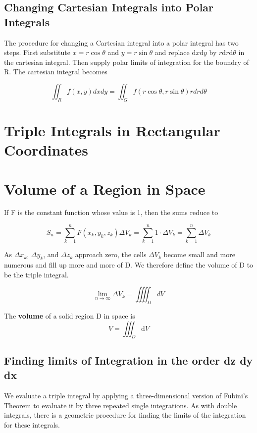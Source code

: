 \documentclass[12pt,a4paper,draft]{article}
\newenvironment{definition}{\begin{definitionbox}}{\end{definitionbox}\vspace{1\baselineskip}}
\begin{document}
\subsection{Changing Cartesian Integrals into Polar Integrals}

The procedure for changing a Cartesian integral into a polar integral has two steps. First substitute \(x = r \cos \theta\) and \(y = r \sin \theta\) and replace \(\mathrm{d}x \mathrm{d}y\) by \(r \mathrm{d}r \mathrm{d}\theta\) in the cartesian integral. Then supply polar limits of integration for the boundry of R. The cartesian integral becomes

\[\iint_R f(x,y) dx dy = \iint_G f(r \cos \theta, r \sin \theta) r dr d\theta\]




\section{Triple Integrals in Rectangular Coordinates}

\section{Volume of a Region in Space}

If F is the constant function whose value is 1, then the sums reduce to

\[S_n = \sum_{k=1}^{n} F(x_k, y_k ,z_k) \Delta V_k = \sum_{k=1}^{n} 1 \cdot \Delta V_k = \sum_{k=1}^{n}  \Delta V_k \] 




As \(\Delta x_k\), \(\Delta y_k\), and \(\Delta z_k\) approach zero, the cells \(\Delta V_k\) become small and more numerous and fill up more and more of D. We therefore define the volume of D to be the triple integral.

\[\lim_{n \to \infty} \Delta V_k = \iiiint_D dV\]



\begin{definition}
    The \textbf{volume} of a solid region D in space is
    \[V = \iiint_D \mathrm{d}V\]
\end{definition}


\subsection{Finding limits of Integration in the order dz dy dx}

We evaluate a triple integral by applying a three-dimensional version of Fubini's Theorem to evaluate it by three repeated single integrations. As with double integrals, there is a geometric procedure for finding the limits of the integration for these integrals.
\end{document}
